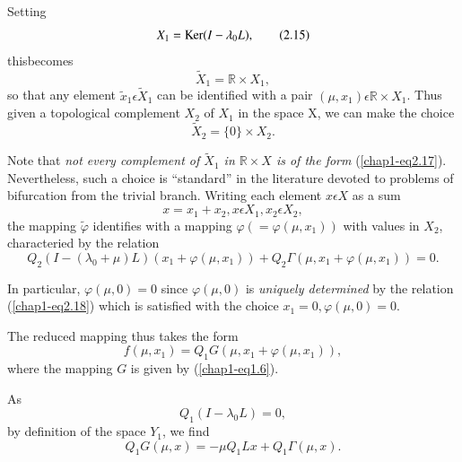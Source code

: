 Setting
\begin{equation*}
X_{1} = \operatorname{Ker}(I - \lambda_{0}L),\tag{2.15}\label{chap1-eq2.15}
\end{equation*}
this\pageoriginale becomes
\begin{equation*}
\widetilde{X}_{1} = \mathbb{R} \times X_{1},\tag{2.16}\label{chap1-eq2.16}
\end{equation*}
so that any element $\widetilde{x}_{1} \epsilon \widetilde{X}_{1}$ can be identified with a pair $(\mu, x_{1}) \epsilon \mathbb{R} \times X_{1}$. Thus given a topological complement $X_{2}$ of $X_{1}$ in the space X, we can make the choice
\begin{equation*}
\widetilde{X}_{2} = \{0\} \times X_{2}.\tag{2.17}\label{chap1-eq2.17}
\end{equation*}

Note that {\em not every complement of $\widetilde{X}_{1}$ in $\mathbb{R} \times X$ is of the form} (\ref{chap1-eq2.17}). Nevertheless, such a choice is ``standard'' in the literature devoted to problems of bifurcation from the trivial branch. Writing each element $x \epsilon X$ as a sum
$$
x = x_{1} + x_{2}, x \epsilon X_{1}, x_{2} \epsilon X_{2},
$$
the mapping $\widetilde{\varphi}$ identifies with a mapping $\varphi(= \varphi(\mu, x_{1}))$ with values in $X_{2}$, characteried by the relation
\begin{equation*}
Q_{2} (I - (\lambda_{0} + \mu)L) (x_{1} + \varphi(\mu, x_{1})) + Q_{2}\Gamma(\mu, x_{1} + \varphi (\mu, x_{1})) = 0. \tag{2.18}\label{chap1-eq2.18}
\end{equation*}

\begin{remark}\label{chap1-rem2.3}
In particular, $\varphi(\mu, 0) = 0$ since $\varphi(\mu, 0)$ is {\em uniquely determined} by the relation (\ref{chap1-eq2.18}) which is satisfied with the choice $x_{1} = 0, \varphi(\mu, 0) = 0$.
\end{remark}

The reduced mapping thus takes the form
\begin{equation*}
f(\mu, x_{1}) = Q_{1}G(\mu, x_{1} + \varphi(\mu, x_{1})),\tag{2.19}\label{chap1-eq2.19}
\end{equation*}
where the mapping $G$ is given by (\ref{chap1-eq1.6}).

As\pageoriginale
\begin{equation*}
Q_{1} (I - \lambda_{0}L) = 0,\tag{2.20}\label{chap1-eq2.20}
\end{equation*}
by definition of the space $Y_{1}$, we find
$$
Q_{1}G(\mu, x) = -\mu Q_{1} L x + Q_{1} \Gamma(\mu, x).
$$


